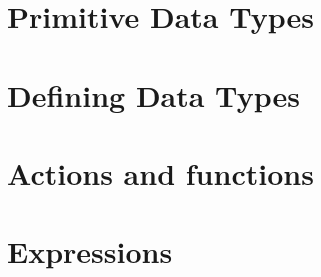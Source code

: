 







\chapter{Primitive Data Types}


\chapter{Defining Data Types}



\chapter{Actions and functions}


\chapter{Expressions}


